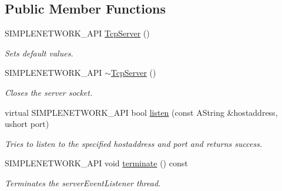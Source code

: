 \subsection*{Public Member Functions}
\begin{DoxyCompactItemize}
\item 
\mbox{\label{class_tcp_server_abc977059ef61f1c42f5fda1bc5945ab0}} 
S\+I\+M\+P\+L\+E\+N\+E\+T\+W\+O\+R\+K\+\_\+\+A\+PI \mbox{\hyperlink{class_tcp_server_abc977059ef61f1c42f5fda1bc5945ab0}{Tcp\+Server}} ()
\begin{DoxyCompactList}\small\item\em Sets default values. \end{DoxyCompactList}\item 
\mbox{\label{class_tcp_server_a728a9e31c53cf86887f1f6149b1c46dd}} 
S\+I\+M\+P\+L\+E\+N\+E\+T\+W\+O\+R\+K\+\_\+\+A\+PI \mbox{\hyperlink{class_tcp_server_a728a9e31c53cf86887f1f6149b1c46dd}{$\sim$\+Tcp\+Server}} ()
\begin{DoxyCompactList}\small\item\em Closes the server socket. \end{DoxyCompactList}\item 
virtual S\+I\+M\+P\+L\+E\+N\+E\+T\+W\+O\+R\+K\+\_\+\+A\+PI bool \mbox{\hyperlink{class_tcp_server_a91c1c56fff64ace30c2622d0d939807e}{listen}} (const A\+String \&hostaddress, ushort port)
\begin{DoxyCompactList}\small\item\em Tries to listen to the specified hostaddress and port and returns success. \end{DoxyCompactList}\item 
\mbox{\label{class_tcp_server_a6f8ced2c4ccd9efe492088d2c35ad7c7}} 
S\+I\+M\+P\+L\+E\+N\+E\+T\+W\+O\+R\+K\+\_\+\+A\+PI void \mbox{\hyperlink{class_tcp_server_a6f8ced2c4ccd9efe492088d2c35ad7c7}{terminate}} () const
\begin{DoxyCompactList}\small\item\em Terminates the server\+Event\+Listener thread. \end{DoxyCompactList}\end{DoxyCompactItemize}
